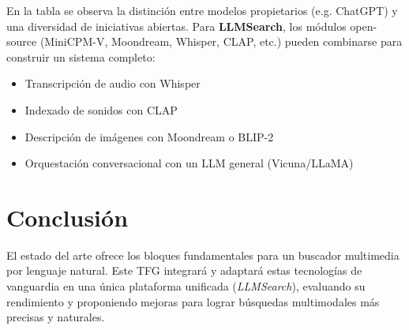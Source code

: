 \begin{table}[h]
  \centering
  \caption{Comparativa de modelos representativos en lenguaje y multimodalidad.}
  \label{tab:comparativa_modelos}
\end{table}

En la tabla se observa la distinción entre modelos propietarios (e.g. ChatGPT) y una diversidad de iniciativas abiertas. Para \textbf{LLMSearch}, los módulos open-source (MiniCPM-V, Moondream, Whisper, CLAP, etc.) pueden combinarse para construir un sistema completo:
\begin{itemize}
  \item Transcripción de audio con Whisper
  \item Indexado de sonidos con CLAP
  \item Descripción de imágenes con Moondream o BLIP-2
  \item Orquestación conversacional con un LLM general (Vicuna/LLaMA)
\end{itemize}

\section{Conclusión}

El estado del arte ofrece los bloques fundamentales para un buscador multimedia por lenguaje natural. Este TFG integrará y adaptará estas tecnologías de vanguardia en una única plataforma unificada (\emph{LLMSearch}), evaluando su rendimiento y proponiendo mejoras para lograr búsquedas multimodales más precisas y naturales.